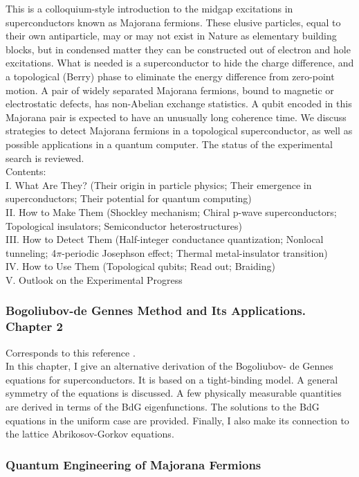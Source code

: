 This is a colloquium-style introduction to the midgap excitations in superconductors known as Majorana fermions. These elusive particles, equal to their own antiparticle, may or may not exist in Nature as elementary building blocks, but in condensed matter they can be constructed out of electron and hole excitations. What is needed is a superconductor to hide the charge difference, and a topological (Berry) phase to eliminate the energy difference from zero-point motion. A pair of widely separated Majorana fermions, bound to magnetic or electrostatic defects, has non-Abelian exchange statistics. A qubit encoded in this Majorana pair is expected to have an unusually long coherence time. We discuss strategies to detect Majorana fermions in a topological superconductor, as well as possible applications in a quantum computer. The status of the experimental search is reviewed.\\
Contents:\\
I. What Are They? (Their origin in particle physics; Their emergence in superconductors; Their potential for quantum computing)\\
II. How to Make Them (Shockley mechanism; Chiral p-wave superconductors; Topological insulators; Semiconductor heterostructures)\\
III. How to Detect Them (Half-integer conductance quantization; Nonlocal tunneling; 4$\pi$-periodic Josephson effect; Thermal metal-insulator transition)\\
IV. How to Use Them (Topological qubits; Read out; Braiding)\\
V. Outlook on the Experimental Progress

\subsubsection{Bogoliubov-de Gennes Method and Its Applications. Chapter 2}

Corresponds to this reference \cite{2016zhu}.\\

In this chapter, I give an alternative derivation of the Bogoliubov-
de Gennes equations for superconductors. It is based on a tight-binding model.
A general symmetry of the equations is discussed. A few physically measurable
quantities are derived in terms of the BdG eigenfunctions. The solutions to the BdG equations in the uniform case are provided. Finally, I also make its connection to the lattice Abrikosov-Gorkov equations.

\subsubsection{Quantum Engineering of Majorana Fermions}

